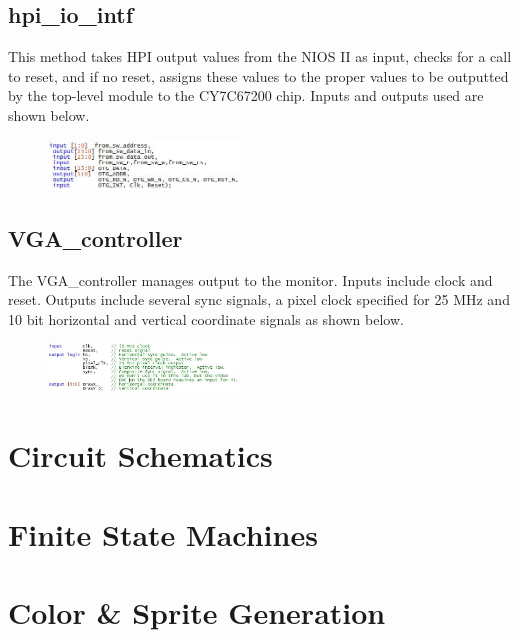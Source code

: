 \documentclass[journal, twocolumn, final,11pt,letterpaper]{IEEEtran}
\begin{document}
	\subsection{hpi\_io\_intf}
	This method takes HPI output values from the NIOS II as input, checks for a call to reset, and if no reset, assigns these values to the proper values to be outputted by the top-level module to the CY7C67200 chip.  Inputs and outputs used are shown below. 
	
	\begin{figure}[h]
		\centering
		\includegraphics[width=0.45\textwidth]{hpiio.jpg}
		\label{fig:hpiio}
	\end{figure}
	
	\subsection{VGA\_controller}
	The VGA\_controller manages output to the monitor.  Inputs include clock and reset. Outputs include several sync signals, a pixel clock specified for 25 MHz and 10 bit horizontal and vertical coordinate signals as shown below.
	
	\begin{figure}[h]
		\centering
		\includegraphics[width=0.45\textwidth]{VGAio.jpg}
		\label{fig:VGAio}
	\end{figure}
	

	
\section{Circuit Schematics}

\section{Finite State Machines}

\section{Color \& Sprite Generation}
\end{document}
